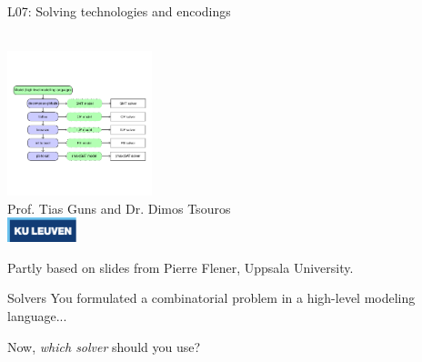 \documentclass{cons-beamer}
\begin{document}
\begin{frame}{L07: Solving technologies and encodings}
  \begin{center}
    ~ \\
    \includegraphics[height=42mm, trim=0 50pt 0 50pt, clip]{images/ch6-logo.png} \\
    Prof. Tias Guns and Dr. Dimos Tsouros \\[0.5em]
    \includegraphics[width=2cm]{images/kuleuven_CMYK_logo.pdf}
  \end{center}
  
  {\footnotesize 
  Partly based on slides from Pierre Flener, Uppsala University.}
\end{frame}

\begin{frame}{Solvers}
  You formulated a combinatorial problem in a high-level modeling language...
  \vfill 

  Now, \textit{which solver} should you use?
  \vfill

\end{frame}
\end{document}
